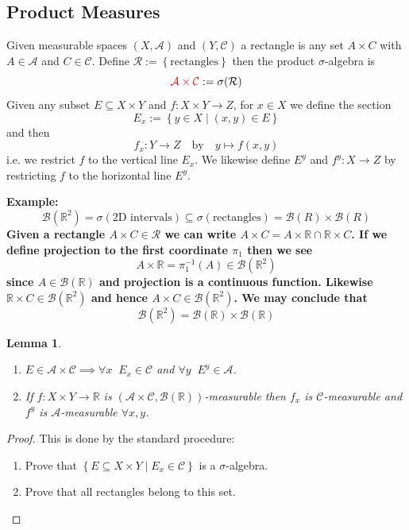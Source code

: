 \documentclass[11pt]{article}
\newcommand{\defeq}{:=}
\newcommand{\relmiddle}[1]{\mathrel{}\middle#1\mathrel{}}
\newcommand{\rmv}{\relmiddle|}
\newcommand{\R}{\mathbb{R}}
\newenvironment{defin}
	{\begin{mdframed}[backgroundcolor=white, roundcorner=5pt, linewidth=1pt]}
	{\end{mdframed}}
\newcommand{\mdf}[1]{{\color{red} #1}}
\newenvironment{eg}
{\begin{mdframed}[backgroundcolor=mylg,roundcorner=5pt,linewidth=0pt]\bfseries{Example:}\normalfont}
	{\end{mdframed}}
\newtheorem{lemma}[theorem]{Lemma}
\begin{document}
\subsection{Product Measures}
\begin{defin}
	Given measurable spaces $(X, \mathcal{A})$ and $(Y, \mathcal{C})$ a \mdf{rectangle} is any set $A\times C$ with $A\in\mathcal{A}$ and $C\in\mathcal{C}$.	
	Define $\mathcal{R}\defeq\left\{\text{rectangles}\right\}$ then the \mdf{product $\sigma$-algebra} is
	\[
		\mdf{\mathcal{A}\times\mathcal{C}}\defeq \sigma(\mathcal{R})
	\]
	Given any subset $E\subseteq X\times Y$ and $f:X\times Y \to Z$, for $x\in X$ we define the \mdf{section}
	\[
		E_x\defeq\left\{y\in X \rmv (x,y)\in E\right\}
	\]
	and then
	\[
		f_x:Y\to Z \quad \text{by} \quad y\mapsto f(x,y)
	\]
	i.e. we restrict $f$ to the vertical line $E_x$.
	We likewise define $E^y$ and $f^y:X\to Z$ by restricting $f$ to the horizontal line $E^y$.
\end{defin}
\begin{eg}
	\[
		\mathcal{B}(\R^2)=\sigma(\text{2D intervals})\subseteq \sigma(\text{rectangles})=\mathcal{B}(R)\times\mathcal{B}(R)
	\]
	Given a rectangle $A\times C\in \mathcal{R}$ we can write $A\times C=A\times\R \cap \R\times C$.
	If we define projection to the first coordinate $\pi_1$ then we see
	\[
		A\times\R=\pi_1^{-1}(A)\in\mathcal{B}(\R^2)
	\]
	since $A\in\mathcal{B}(\R)$ and projection is a continuous function.
	Likewise $\R\times C\in\mathcal{B}(\R^2)$ and hence $A\times C\in \mathcal{B}(\R^2)$.
	We may conclude that
	\[
		\mathcal{B}(\R^2)=\mathcal{B}(\R)\times\mathcal{B}(\R)
	\]
\end{eg}
\begin{lemma}
\begin{enumerate}[label=(\alph*)]
	\item $E\in\mathcal{A}\times\mathcal{C}\implies \forall x \;\; E_x\in\mathcal{C}$ and $\forall y \;\; E^y\in\mathcal{A}$.
	\item If $f:X\times Y \to \R$ is $(\mathcal{A}\times\mathcal{C}, \mathcal{B}(\R))$-measurable then $f_x$ is $\mathcal{C}$-measurable and $f^y$ is $\mathcal{A}$-measurable $\forall x,y$.
\end{enumerate}
\end{lemma}
\begin{proof}
This is done by the standard procedure:
\begin{enumerate}[label=(\roman*)]
	\item Prove that $\left\{E\subseteq X\times Y \rmv E_x\in\mathcal{C}\right\}$ is a $\sigma$-algebra.
	\item Prove that all rectangles belong to this set.
\end{enumerate}
\end{proof}
\end{document}
